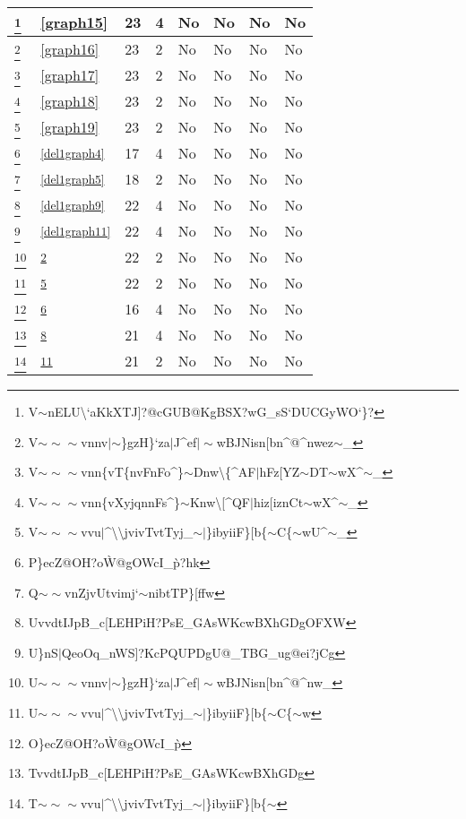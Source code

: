 \documentclass[12pt]{article}
\theoremstyle{parenbold}
\begin{document}
\begin{center}
\begin{minipage}{\textwidth}
\begin{tabular}{ |p{1cm}|p{1.2cm}|p{1.5cm}|p{0.5cm}|p{1.5cm}|p{2.7cm}|p{2cm}|p{1cm}| }
 \hline
  \footnote{V$\sim$nELU\textbackslash{}`aKkXTJ]?@cGUB@KgBSX?wG\_sS`DUCGyWO`\}?\label{del1graph14}} & \ref{graph15} & 23 & 4 & No & No & No & No\\
 \hline
  \footnote{V$\sim\sim\sim$vnnv$\vert$$\sim$\}gzH\}`za$\vert$J\^{}ef$\vert\sim$wBJNisn[bn\^{}@\^{}nwez$\sim$\_\label{del1graph15}} & \ref{graph16} & 23 & 2 & No & No & No & No\\
 \hline
  \footnote{V$\sim\sim\sim$vnn\{vT\{nvFnFo\^{}\}$\sim$Dnw\textbackslash{}\{\^{}AF$\vert$hFz[YZ$\sim$DT$\sim$wX\^{}$\sim$\_\label{del1graph16}} & \ref{graph17} & 23 & 2 & No & No & No & No\\
 \hline
  \footnote{V$\sim\sim\sim$vnn\{vXyjqnnFs\^{}\}$\sim$Knw\textbackslash{}[\^{}QF$\vert$hiz[iznCt$\sim$wX\^{}$\sim$\_\label{del1graph17}} & \ref{graph18} & 23 & 2 & No & No & No & No\\
 \hline
  \footnote{V$\sim\sim\sim$vvu$\vert$\^{}\textbackslash{}\textbackslash{}jvivTvtTyj\_$\sim\vert$\}ibyiiF\}[b\{$\sim$C\{$\sim$wU\^{}$\sim$\_\label{del1graph18}} & \ref{graph19} & 23 & 2 & No & No & No & No\\
 \hline
 \footnote{P\}ecZ@OH?o\`W@gOWcI\_\`p?hk\label{del2graph1}} & \textsuperscript{\ref{del1graph4}} & 17 & 4 & No & No & No & No\\
 \hline
 \footnote{Q$\sim\sim$vnZjvUtvimj`$\sim$nibtTP\}[ffw\label{del2graph2}} & \textsuperscript{\ref{del1graph5}} & 18 & 2 & No & No & No & No\\
 \hline
 \footnote{UvvdtIJpB\_c[LEHPiH?PsE\_GAsWKcwBXhGDgOFXW\label{del2graph3}} & \textsuperscript{\ref{del1graph9}} & 22 & 4 & No & No & No & No\\
 \hline
 \footnote{U\}nS$\vert$QeoOq\_nWS]?KcPQUPDgU@\_TBG\_ug@ei?jCg\label{del2graph4}} & \textsuperscript{\ref{del1graph11}} & 22 & 4 & No & No & No & No\\
 \hline
 \footnote{U$\sim\sim\sim$vnnv$\vert$$\sim$\}gzH\}`za$\vert$J\^{}ef$\vert\sim$wBJNisn[bn\^{}@\^{}nw\_\label{del2graph5}} & \textsuperscript{\ref{del1graph15}} & 22 & 2 & No & No & No & No\\
 \hline
 \footnote{U$\sim\sim\sim$vvu$\vert$\^{}\textbackslash{}\textbackslash{}jvivTvtTyj\_$\sim\vert$\}ibyiiF\}[b\{$\sim$C\{$\sim$w\label{del2graph6}} & \textsuperscript{\ref{del1graph18}} & 22 & 2 & No & No & No & No\\
 \hline
 \footnote{O\}ecZ@OH?o\`W@gOWcI\_\`p\label{del3graph1}} & \textsuperscript{\ref{del2graph1}} & 16 & 4 & No & No & No & No\\
 \hline
 \footnote{TvvdtIJpB\_c[LEHPiH?PsE\_GAsWKcwBXhGDg\label{del3graph2}} & \textsuperscript{\ref{del2graph3}} & 21 & 4 & No & No & No & No\\
 \hline
 \footnote{T$\sim\sim\sim$vvu$\vert$\^{}\textbackslash{}\textbackslash{}jvivTvtTyj\_$\sim\vert$\}ibyiiF\}[b\{$\sim$\label{del3graph3}} & \textsuperscript{\ref{del2graph6}} & 21 & 2 & No & No & No & No\\
 \hline
 
 
\end{tabular}
\end{minipage}
\end{center}
\end{document}
